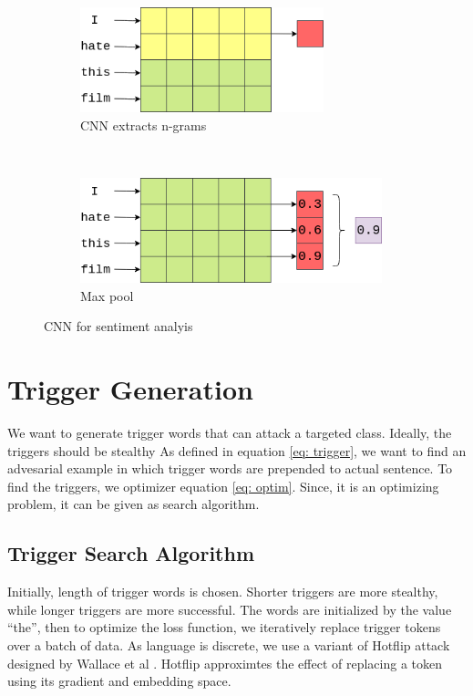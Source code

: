 \documentclass[12pt]{report}
\begin{document}
\begin{spacing}{1.5}
\begin{figure}[ht!]
    \centering
    \begin{subfigure}[t]{0.5\textwidth}
        \centering
        \includegraphics[height=1.2in]{./img/conv_work.png}
        \caption{CNN extracts n-grams}
    \end{subfigure}%
    ~ 
    \begin{subfigure}[t]{0.5\textwidth}
        \centering
        \includegraphics[height=1.2in]{./img/pool_work.png}
        \caption{Max pool}
    \end{subfigure}
    \caption{CNN for sentiment analyis}
 \end{figure}
  
\section{Trigger Generation}
We want to generate trigger words that can attack a targeted class. Ideally, the triggers should be stealthy 
As defined in equation \ref{eq: trigger}, we want to find an advesarial example in which trigger words are prepended to actual sentence. To find the triggers, we optimizer equation \ref{eq: optim}. Since, it is an optimizing problem, it can be given as search algorithm.

\subsection*{Trigger Search Algorithm}
Initially, length of trigger words is chosen. Shorter triggers are more stealthy, while longer triggers are more successful. The words are initialized by the value ``the'', then to optimize the loss function, we iteratively replace trigger tokens over a batch of data. As language is discrete, we use a variant of Hotflip \cite{ebrahimi2018} attack designed by Wallace et al \cite{wallace2019}. Hotflip approximtes the effect of replacing a token using its gradient and embedding space.


\end{spacing}
\end{document}
